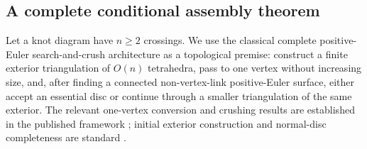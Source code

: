 \subsection{A complete conditional assembly theorem}

Let a knot diagram have $n\ge2$ crossings. We use the classical complete positive-Euler search-and-crush architecture as a topological premise: construct a finite exterior triangulation of $O(n)$ tetrahedra, pass to one vertex without increasing size, and, after finding a connected non-vertex-link positive-Euler surface, either accept an essential disc or continue through a smaller triangulation of the same exterior. The relevant one-vertex conversion and crushing results are established in the published framework \cite{BO}; initial exterior construction and normal-disc completeness are standard \cite{HLP}.

